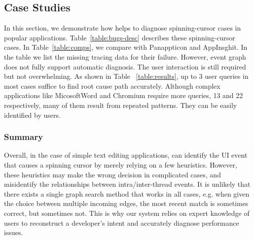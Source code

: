 \subsection{Case Studies}\label{sec:casestudy}

In this section, we demonstrate how \xxx helps to diagnose \nbug
spinning-cursor cases in popular applications. Table~\ref{table:bugs-desc}
describes these spinning-cursor cases. In Table~\ref{table:comps}, we compare
\xxx with Panappticon and AppInsghit. In the table we list the missing tracing
data for their failure. However, \xxx event graph does not fully support
automatic diagnosis. The user interaction is still required but not
overwhelming. As shown in Table ~\ref{table:results}, up to 3 user queries in
most cases suffice to find root cause path accurately. Although complex
applications like MicosoftWord and Chromium require more queries, 13 and 22
respectively, many of them result from repeated patterns. They can be easily
identified by users.








\subsubsection{Summary}
Overall, in the case of simple text editing applications, \xxx can identify the
UI event that causes a spinning cursor by merely relying on a few heuristics.
However, these heuristics may make the wrong decision in complicated cases, and
misidentify the relationships between intra/inter-thread events. It is unlikely
that there exists a single graph search method that works in all cases, e.g.
when given the choice between multiple incoming edges, the most recent match is
sometimes correct, but sometimes not. This is why our system relies on expert
knowledge of users to reconstruct a developer's intent and accurately diagnose
performance issues.
